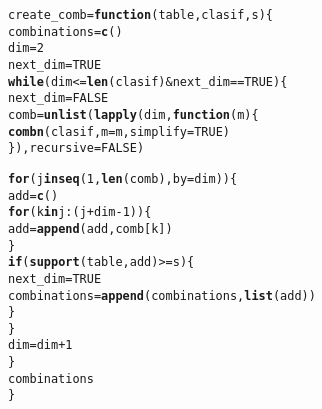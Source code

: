 \documentclass[12pt]{report}\usepackage[]{graphicx}\usepackage[dvipsnames]{xcolor}
\makeatletter
\newcommand{\hlnum}[1]{\textcolor[rgb]{0.686,0.059,0.569}{#1}}%
\newcommand{\hlopt}[1]{\textcolor[rgb]{0,0,0}{#1}}%
\newcommand{\hlstd}[1]{\textcolor[rgb]{0.345,0.345,0.345}{#1}}%
\newcommand{\hlkwa}[1]{\textcolor[rgb]{0.161,0.373,0.58}{\textbf{#1}}}%
\newcommand{\hlkwb}[1]{\textcolor[rgb]{0.69,0.353,0.396}{#1}}%
\newcommand{\hlkwc}[1]{\textcolor[rgb]{0.333,0.667,0.333}{#1}}%
\newcommand{\hlkwd}[1]{\textcolor[rgb]{0.737,0.353,0.396}{\textbf{#1}}}%
\newenvironment{kframe}{%
 \def\at@end@of@kframe{}%
 \ifinner\ifhmode%
  \def\at@end@of@kframe{\end{minipage}}%
  \begin{minipage}{\columnwidth}%
 \fi\fi%
 \def\FrameCommand##1{\hskip\@totalleftmargin \hskip-\fboxsep
 \colorbox{shadecolor}{##1}\hskip-\fboxsep
     \hskip-\linewidth \hskip-\@totalleftmargin \hskip\columnwidth}%
 \MakeFramed {\advance\hsize-\width
   \@totalleftmargin\z@ \linewidth\hsize
   \@setminipage}}%
 {\par\unskip\endMakeFramed%
 \at@end@of@kframe}
\newenvironment{knitrout}{}{} %
\makeatother
\begin{document}
			
			
\begin{knitrout}
\color{fgcolor}\begin{kframe}
\begin{alltt}
\hlstd{create_comb} \hlkwb{=} \hlkwa{function}\hlstd{(}\hlkwc{table}\hlstd{,} \hlkwc{clasif}\hlstd{,} \hlkwc{s}\hlstd{) \{}
        \hlstd{combinations} \hlkwb{=} \hlkwd{c}\hlstd{()}
        \hlstd{dim} \hlkwb{=} \hlnum{2}
        \hlstd{next_dim} \hlkwb{=} \hlnum{TRUE}
        \hlkwa{while} \hlstd{(dim} \hlopt{<=} \hlkwd{len}\hlstd{(clasif)} \hlopt{&} \hlstd{next_dim} \hlopt{==} \hlnum{TRUE}\hlstd{) \{}
                \hlstd{next_dim} \hlkwb{=} \hlnum{FALSE}
                \hlstd{comb} \hlkwb{=} \hlkwd{unlist}\hlstd{(}\hlkwd{lapply}\hlstd{(dim,} \hlkwa{function}\hlstd{(}\hlkwc{m}\hlstd{) \{}
                        \hlkwd{combn}\hlstd{(clasif,} \hlkwc{m}\hlstd{=m,} \hlkwc{simplify}\hlstd{=}\hlnum{TRUE}\hlstd{)}
                        \hlstd{\}),} \hlkwc{recursive}\hlstd{=}\hlnum{FALSE}\hlstd{)}

                \hlkwa{for} \hlstd{(j} \hlkwa{in} \hlkwd{seq}\hlstd{(}\hlnum{1}\hlstd{,} \hlkwd{len}\hlstd{(comb),} \hlkwc{by}\hlstd{=dim)) \{}
                        \hlstd{add} \hlkwb{=} \hlkwd{c}\hlstd{()}
                        \hlkwa{for} \hlstd{(k} \hlkwa{in} \hlstd{j}\hlopt{:}\hlstd{(j}\hlopt{+}\hlstd{dim}\hlopt{-}\hlnum{1}\hlstd{)) \{}
                                \hlstd{add} \hlkwb{=} \hlkwd{append}\hlstd{(add, comb[k])}
                        \hlstd{\}}
                        \hlkwa{if} \hlstd{(}\hlkwd{support}\hlstd{(table, add)} \hlopt{>=} \hlstd{s) \{}
                                \hlstd{next_dim} \hlkwb{=} \hlnum{TRUE}
                                \hlstd{combinations} \hlkwb{=} \hlkwd{append}\hlstd{(combinations,} \hlkwd{list}\hlstd{(add))}
                        \hlstd{\}}
                \hlstd{\}}
                \hlstd{dim} \hlkwb{=} \hlstd{dim}\hlopt{+}\hlnum{1}
        \hlstd{\}}
        \hlstd{combinations}
\hlstd{\}}
\end{alltt}
\end{kframe}
\end{knitrout}
			
			
			
\end{document}

